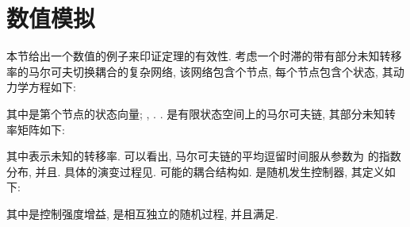 \section{数值模拟}
    \begin{comment}
     \begin{center}
            \subcomment[]{\texttt{[image: delay/tuopu1.eps]}}
            \subcomment[]{\texttt{[image: delay/tuopu2.eps]}}
            \subcomment[]{\texttt{[image: delay/tuopu3.eps]}}
     \end{center}
  \caption{网络系统在不同马氏链状态下可能的拓扑结构图.}\label{tuopu}
  \end{comment}
        本节给出一个数值的例子来印证定理的有效性. 考虑一个时滞的带有部分未知转移率的马尔可夫切换耦合的复杂网络, 该网络包含个节点, 每个节点包含个状态, 其动力学方程如下:
        \begin{comment}\label{numbersys}
           \nonumber \dot{x}_{i}(t)&=f(t,x_{i}(t),x_i(t-\tau))-c\sum^5_{j=1}l_{ij}(r_{t})[x_{j}(t_k)-x_{i}(t_{k})]+u_i(t),\\
            &\quad\quad t_{k}\leq t< t_{k+1} \quad i = 1,\cdots,5,
        \end{comment}
        其中是第个节点的状态向量; , . . 是有限状态空间上的马尔可夫链, 其部分未知转率矩阵如下:


    其中表示未知的转移率. 可以看出, 马尔可夫链的平均逗留时间服从参数为 的指数分布, 并且. 具体的演变过程见.
    可能的耦合结构如.
是随机发生控制器, 其定义如下:

其中是控制强度增益, 是相互独立的随机过程, 并且满足.
\begin{comment}[!htb]
\begin{minipage}[t]{0.48\linewidth}
\centering
\texttt{[image: delay/comment1.eps]}
\caption{马尔可夫链在转移概率矩阵下的状态切换.}
\label{Markovfig}
\end{minipage}~~
\begin{minipage}[t]{0.48\linewidth}
\centering
\texttt{[image: delay/comment2.eps]}
\caption{基于事件激发随机发生控制策略下, 时滞马氏系统  在参数下的节点状态向量轨道的变化情况.}
\label{state}
\end{minipage}
\end{comment}
\begin{comment}[!htb]
\begin{minipage}[t]{0.48\linewidth}
\centering
\texttt{[image: delay/comment3.eps]}
\caption{系统  总同步误差轨道.}
\label{totallerror}
\end{minipage}~~
\begin{minipage}[t]{0.48\linewidth}
\centering
\texttt{[image: delay/xi-xj.eps]}
\caption{不同节点间的状态差距演变过程.}\label{xixj}
\end{minipage}
\end{comment}

